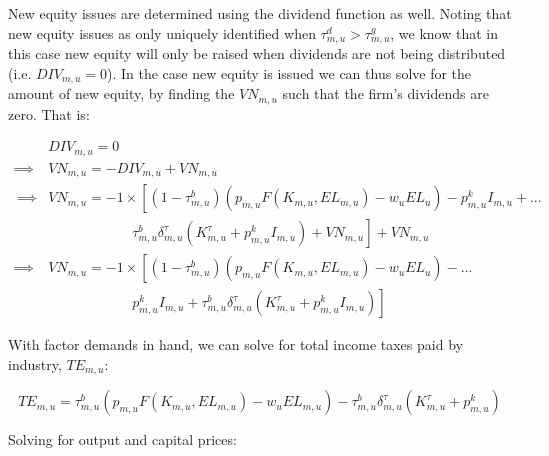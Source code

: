 \documentclass[letterpaper,12pt]{article}
\theoremstyle{definition}
\begin{document}
\begin{spacing}{1.5}
New equity issues are determined using the dividend function as well. Noting that new equity issues as only uniquely identified when $\tau^{d}_{m,u}>\tau^{g}_{m,u}$, we know that in this case new equity will only be raised when dividends are not being distributed (i.e. $DIV_{m,u}=0$).  In the case new equity is issued we can thus solve for the amount of new equity, by finding the $VN_{m,u}$ such that the firm's dividends are zero.  That is:

\begin{equation}
\begin{split}
& DIV_{m,u} = 0 \\
\implies & VN_{m,u} = -DIV_{m,u} + VN_{m,u}\\\
\implies & VN_{m,u} = -1\times \left[(1-\tau^{b}_{m,u})\left(p_{m,u}F(K_{m,u},EL_{m,u})-w_{u}EL_{u}\right) - p^{k}_{m,u}I_{m,u}+... \right. \\
& \left. \quad\quad\quad\quad\quad\quad \tau^{b}_{m,u}\delta^{\tau}_{m,u}(K^{\tau}_{m,u}+p^{k}_{m,u}I_{m,u})+VN_{m,u}\right] + VN_{m,u} \\
\implies & VN_{m,u} = -1\times \left[(1-\tau^{b}_{m,u})\left(p_{m,u}F(K_{m,u},EL_{m,u})-w_{u}EL_{u}\right) - ... \right. \\
& \left.  \quad\quad\quad\quad\quad\quad  p^{k}_{m,u}I_{m,u}+\tau^{b}_{m,u}\delta^{\tau}_{m,u}(K^{\tau}_{m,u}+p^{k}_{m,u}I_{m,u})\right]   
 \end{split}
\end{equation} 
  

With factor demands in hand, we can solve for total income taxes paid by industry, $TE_{m,u}$:

\begin{equation}
\label{eqn:inc_tax_firm}
TE_{m,u} = \tau^{b}_{m,u}\left(p_{m,u}F(K_{m,u},EL_{m,u})-w_{u}EL_{m,u} \right) - \tau^{b}_{m,u}\delta^{\tau}_{m,u}(K^{\tau}_{m,u}+p^{k}_{m,u})
\end{equation}


Solving for output and capital prices:


\end{spacing}
\end{document}
